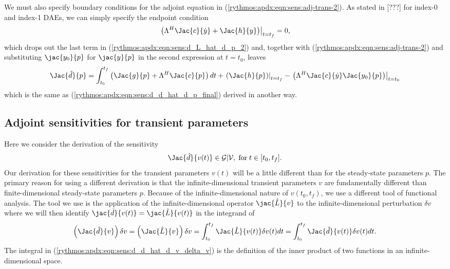 %
We must also specify boundary conditions for the adjoint equation in
(\ref{rythmos:apdx:eqn:sens:adj-trans-2}).  As stated in [???] for index-0 and
index-1 DAEs, we can simply specify the endpoint condition
%
\begin{equation}
\left. \left(
  \Lambda^H \Jac{c}{\dot{y}}
  +  \Jac{h}{y}
\right) \right|_{t=t_f}
 = 0,
\label{rythmos:apdx:eqn:sens:adj-trans:fc-2}
\end{equation}
%
which drops out the last term in (\ref{rythmos:apdx:eqn:sens:d_L_hat_d_p_2})
and, together with (\ref{rythmos:apdx:eqn:sens:adj-trans-2}) and substituting
$\jac{y_0}{p}$ for $\jac{y}{p}$ in the second expression at $t=t_0$, leaves
%
\begin{equation}
\Jac{\hat{d}}{p} =
\int_{t_0}^{t_f} \left(
    \Jac{g}{p}
    + \Lambda^H \Jac{c}{p}
  \right) dt
  + \left. \left( \Jac{h}{p} \right) \right|_{t=t_f}
  - \left. \left( \Lambda^H \Jac{c}{\dot{y}} \Jac{y_0}{p} \right) \right|_{t=t_0}
\label{rythmos:apdx:eqn:sens:d_d_hat_d_p_final-2}
\end{equation}
%
which is the same as (\ref{rythmos:apdx:eqn:sens:d_d_hat_d_p_final}) derived
in another way.

\subsection{Adjoint sensitivities for transient parameters}

Here we consider the derivation of the sensitivity
%
\begin{equation}
\Jac{\hat{d}}{v(t)} \in \mathcal{G}|\mathcal{V}, \; \mbox{for} \; t\in[t_0,t_f].
\end{equation}
%
Our derivation for these sensitivities for the transient parameters $v(t)$
will be a little different than for the steady-state parameters $p$.  The
primary reason for using a different derivation is that the
infinite-dimensional transient parameters $v$ are fundamentally different than
finite-dimensional steady-state parameters $p$.  Because of the
infinite-dimensional nature of $v(t_0,t_f)$, we use a different tool of
functional analysis.  The tool we use is the application of the
infinite-dimensional operator $\jac{\hat{L}}{v}$ to the infinite-dimensional
perturbation $\delta v$ where we will then identify $\jac{\hat{d}}{v(t)} =
{}\jac{\hat{L}}{v(t)}$ in the integrand of
%
\begin{equation}
\left( \Jac{\hat{d}}{v} \right) \delta v
= \left( \Jac{\hat{L}}{v} \right) \delta v
= \int_{t_0}^{t_f} \Jac{\hat{L}}{v(t)} \delta v(t) dt
= \int_{t_0}^{t_f} \Jac{\hat{d}}{v(t)} \delta v(t) dt.
\label{rythmos:apdx:eqn:sens:d_d_hat_d_v_delta_v}
\end{equation}
%
The integral in (\ref{rythmos:apdx:eqn:sens:d_d_hat_d_v_delta_v}) is the
definition of the inner product of two functions in an
infinite-dimensional space.
   

